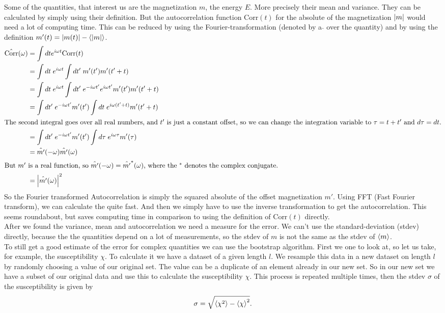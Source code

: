 Some of the quantities, that interest us are the magnetization $m$, the energy $E$. More precisely their mean and variance. They can be calculated by simply using their definition. But the autocorrelation function Corr$(t)$ for the absolute of the magnetization $\left\vert m \right\vert$ would need a lot of computing time. This can be reduced by using the Fourier-transformation (denoted by a $\hat{}$ over the quantity) and by using the definition $m'(t) = \left\vert m(t) \right\vert - \left\langle\left\vert m \right\vert\right\rangle$.
\begin{align}
  \hat{\text{Corr}}(\omega) & = \int dt e^{i \omega t} \text{Corr}(t) \\
  & = \int dt \; e^{i \omega t} \int dt'\; m'(t') m'(t'+t) \\
  & = \int dt\; e^{i \omega t} \int dt'\; e^{-i \omega t'} e^{i \omega t'} m'(t') m'(t'+t) \\
  & = \int dt'\; e^{-i \omega t'} m'(t') \int dt\; e^{i \omega (t' + t)} m'(t'+t) \\
  \intertext{The second integral goes over all real numbers, and $t'$ is just a constant offset, so we can change the integration variable to $\tau = t + t'$ and $d \tau = dt$.}
  & = \int dt'\; e^{-i \omega t'} m'(t') \int d\tau \; e^{i \omega \tau} m'(\tau) \\
  & = \hat{m'}(- \omega) \hat{m'}(\omega) \\
  \intertext{But $m'$ is a real function, so $\hat{m'}(- \omega) = \hat{m'}^*( \omega)$, where the $^*$ denotes the complex conjugate.}
  & = \left\vert\hat{m'}(\omega) \right\vert^2
\end{align}
So the Fourier transformed Autocorrelation is simply the squared absolute of the offset magnetization $m'$. Using FFT (Fast Fourier transform), we can calculate the quite fast. And then we simply have to use the inverse transformation to get the autocorrelation. This seems roundabout, but saves computing time in comparison to using the definition of Corr$(t)$ directly.\\

After we found the variance, mean and autocorrelation we need a measure for the error. We can't use the standard-deviation (stdev) directly, because the the quantities depend on a lot of measurements, so the stdev of $m$ is not the same as the stdev of $\left\langle m\right\rangle$.\\
To still get a good estimate of the error for complex quantities we can use the bootstrap algorithm. First we one to look at, so let us take, for example, the susceptibility $\chi$. To calculate it we have a dataset of a given length $l$. We resample this data in a new dataset on length $l$ by randomly choosing a value of our original set. The value can be a duplicate of an element already in our new set. So in our new set we have a subset of our original data and use this to calculate the susceptibility $\chi$. This process is repeated multiple times, then the stdev $\sigma$ of the susceptibility is given by
\begin{equation}
  \sigma = \sqrt{\left\langle\chi^2\right\rangle - \left\langle\chi\right\rangle^2}.
\end{equation}
